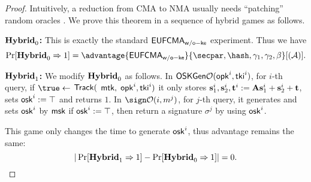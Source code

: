 \begin{proof}
Intuitively, a reduction from CMA to NMA usually needs ``patching'' random oracles \cite{EC:KilLyuSch18,EC:AFLT12}. We prove this theorem in a sequence of hybrid games as follows.

\noindent\textbf{$\mathbf{Hybrid}_0$:} This is exactly the standard $\mathsf{EUFCMA}_\mathsf{w/o-ke}$ experiment. Thus we have $$\Pr[\hyb_0\Rightarrow 1] = \advantage{\eufcmawoke}{\secpar,\hash,\gamma_1,\gamma_2,\beta}[(\Ac)].$$

\noindent\textbf{$\mathbf{Hybrid}_1$:} We modify $\mathbf{Hybrid}_0$ as follows. In $\mathsf{OSKGen}\mathcal{O}(\mathsf{opk}^i,\mathsf{tki}^i)$, for $i$-th query, if $\true\gets$ $\mathsf{Track}($ $\mathsf{mtk},$ $\mathsf{opk}^i,\mathsf{tki}^i)$ it only stores $\mathbf{s}^i_1,\mathbf{s}^i_2, \mathbf{t}^i:=\mathbf{A}\mathbf{s}_1^i+\mathbf{s}_2^i+\mathbf{t}$, sets $\mathsf{osk}^i:=\top$ and returns $1$. In $\sign\Oc(i, m^j)$, for $j$-th query, it generates and sets $\mathsf{osk}^i$ by $\mathsf{msk}$ if $\mathsf{osk}^i:=\top$, then return a signature $\sigma^j$ by using $\mathsf{osk}^i$. 

This game only changes the time to generate $\mathsf{osk}^i$, thus advantage remains the same: $$|\Pr[\mathbf{Hybrid}_1\Rightarrow 1] - \Pr[\mathbf{Hybrid}_0\Rightarrow 1]| = 0.$$


\end{proof}
